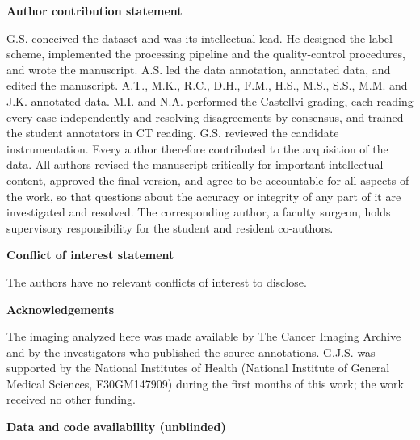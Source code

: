 \documentclass[12pt]{article}
\begin{document}
\vspace{1em}
\noindent\textbf{Author contribution statement}

\noindent G.S. conceived the dataset and was its intellectual lead. He designed the label
scheme, implemented the processing pipeline and the quality-control procedures, and wrote the
manuscript. A.S. led the data annotation, annotated data, and edited the manuscript. A.T.,
M.K., R.C., D.H., F.M., H.S., M.S., S.S., M.M. and J.K. annotated data. M.I. and N.A.
performed the Castellvi grading, each reading every case independently and resolving
disagreements by consensus, and trained the student annotators in CT reading. G.S.
reviewed the candidate instrumentation. Every author therefore contributed to the acquisition of
the data. All authors revised the manuscript critically for important intellectual content,
approved the final version, and agree to be accountable for all aspects of the work, so
that questions about the accuracy or integrity of any part of it are investigated and
resolved. The corresponding author, a faculty surgeon, holds supervisory responsibility for
the student and resident co-authors.

\vspace{1em}
\noindent\textbf{Conflict of interest statement}

\noindent The authors have no relevant conflicts of interest to disclose.

\vspace{1em}
\noindent\textbf{Acknowledgements}

\noindent The imaging analyzed here was made available by The Cancer Imaging Archive and by
the investigators who published the source annotations. G.J.S. was supported by the National Institutes of Health (National Institute of General Medical Sciences, F30GM147909) during the first months of this work; the work received no other funding.

\vspace{1em}
\noindent\textbf{Data and code availability (unblinded)}
\end{document}
